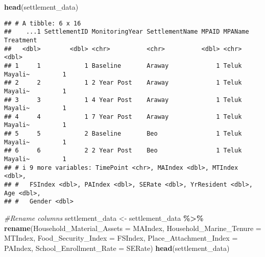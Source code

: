 \documentclass[
]{article}
\newenvironment{Shaded}{\begin{snugshade}}{\end{snugshade}}
\newcommand{\AttributeTok}[1]{\textcolor[rgb]{0.13,0.29,0.53}{#1}}
\newcommand{\CommentTok}[1]{\textcolor[rgb]{0.56,0.35,0.01}{\textit{#1}}}
\newcommand{\FunctionTok}[1]{\textcolor[rgb]{0.13,0.29,0.53}{\textbf{#1}}}
\newcommand{\NormalTok}[1]{#1}
\newcommand{\OtherTok}[1]{\textcolor[rgb]{0.56,0.35,0.01}{#1}}
\newcommand{\SpecialCharTok}[1]{\textcolor[rgb]{0.81,0.36,0.00}{\textbf{#1}}}
\newcommand{\StringTok}[1]{\textcolor[rgb]{0.31,0.60,0.02}{#1}}
\begin{document}
\begin{Shaded}
\begin{Highlighting}[]
\FunctionTok{head}\NormalTok{(settlement\_data)}
\end{Highlighting}
\end{Shaded}

\begin{verbatim}
## # A tibble: 6 x 16
##    ...1 SettlementID MonitoringYear SettlementName MPAID MPAName       Treatment
##   <dbl>        <dbl> <chr>          <chr>          <dbl> <chr>             <dbl>
## 1     1            1 Baseline       Araway             1 Teluk Mayali~         1
## 2     2            1 2 Year Post    Araway             1 Teluk Mayali~         1
## 3     3            1 4 Year Post    Araway             1 Teluk Mayali~         1
## 4     4            1 7 Year Post    Araway             1 Teluk Mayali~         1
## 5     5            2 Baseline       Beo                1 Teluk Mayali~         1
## 6     6            2 2 Year Post    Beo                1 Teluk Mayali~         1
## # i 9 more variables: TimePoint <chr>, MAIndex <dbl>, MTIndex <dbl>,
## #   FSIndex <dbl>, PAIndex <dbl>, SERate <dbl>, YrResident <dbl>, Age <dbl>,
## #   Gender <dbl>
\end{verbatim}

\begin{Shaded}
\begin{Highlighting}[]
\CommentTok{\#Rename columns}
\NormalTok{settlement\_data }\OtherTok{\textless{}{-}}\NormalTok{ settlement\_data }\SpecialCharTok{\%\textgreater{}\%}
                  \FunctionTok{rename}\NormalTok{(}\StringTok{\textasciigrave{}}\AttributeTok{Household\_Material\_Assets}\StringTok{\textasciigrave{}} \OtherTok{=}\NormalTok{ MAIndex, }\StringTok{\textasciigrave{}}\AttributeTok{Household\_Marine\_Tenure}\StringTok{\textasciigrave{}} \OtherTok{=}\NormalTok{ MTIndex, }
                         \StringTok{\textasciigrave{}}\AttributeTok{Food\_Security\_Index}\StringTok{\textasciigrave{}} \OtherTok{=}\NormalTok{ FSIndex, }\StringTok{\textasciigrave{}}\AttributeTok{Place\_Attachment\_Index}\StringTok{\textasciigrave{}} \OtherTok{=}\NormalTok{ PAIndex,}
                          \StringTok{\textasciigrave{}}\AttributeTok{School\_Enrollment\_Rate}\StringTok{\textasciigrave{}} \OtherTok{=}\NormalTok{ SERate)}
\FunctionTok{head}\NormalTok{(settlement\_data)}
\end{Highlighting}
\end{Shaded}
\end{document}
